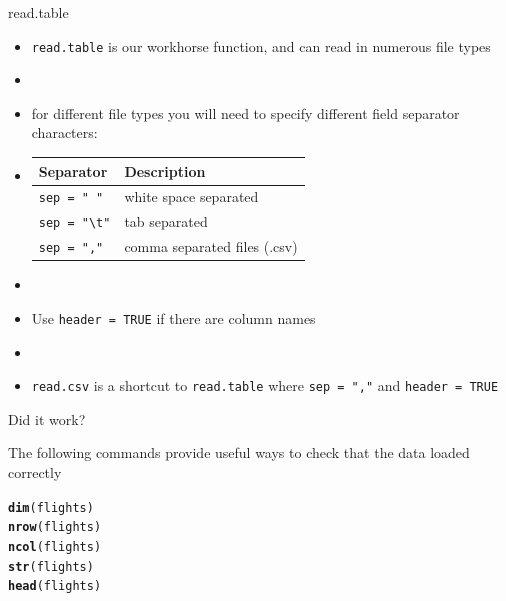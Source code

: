 \documentclass[10pt]{beamer}\usepackage[]{graphicx}\usepackage[]{color}
\makeatletter
\newcommand{\hlstd}[1]{\textcolor[rgb]{0.345,0.345,0.345}{#1}}%
\newcommand{\hlkwd}[1]{\textcolor[rgb]{0.737,0.353,0.396}{\textbf{#1}}}%
\newenvironment{kframe}{%
 \def\at@end@of@kframe{}%
 \ifinner\ifhmode%
  \def\at@end@of@kframe{\end{minipage}}%
  \begin{minipage}{\columnwidth}%
 \fi\fi%
 \def\FrameCommand##1{\hskip\@totalleftmargin \hskip-\fboxsep
 \colorbox{shadecolor}{##1}\hskip-\fboxsep
     \hskip-\linewidth \hskip-\@totalleftmargin \hskip\columnwidth}%
 \MakeFramed {\advance\hsize-\width
   \@totalleftmargin\z@ \linewidth\hsize
   \@setminipage}}%
 {\par\unskip\endMakeFramed%
 \at@end@of@kframe}
\newenvironment{knitrout}{}{} %
\makeatother
\begin{document}
\begin{frame}[fragile]{read.table}

\begin{itemize}
\item \texttt{read.table} is our workhorse function, and can read in numerous file types

\item[]

\item for different file types you will need to specify different field separator characters:\\

\item[]

\begin{tabular}{l  l} \hline
  Separator    & Description\\ \hline
  \texttt{sep = " "}  & white space separated\\
  \verb|sep = "\t"| & tab separated\\
  \texttt{sep = ","}  & comma separated files (.csv) \\ \hline
\end{tabular}

\item[]

\item Use \texttt{header = TRUE} if there are column names

\item[]

\item \texttt{read.csv} is a shortcut to \texttt{read.table} where \texttt{sep = ","} and \texttt{header = TRUE}
\end{itemize}

\end{frame}


\begin{frame}[fragile]{Did it work?}

The following commands provide useful ways to check that the data loaded correctly

\begin{knitrout}\small
{}\color{fgcolor}\begin{kframe}
\begin{alltt}
\hlkwd{dim}\hlstd{(flights)}
\hlkwd{nrow}\hlstd{(flights)}
\hlkwd{ncol}\hlstd{(flights)}
\hlkwd{str}\hlstd{(flights)}
\hlkwd{head}\hlstd{(flights)}
\end{alltt}
\end{kframe}
\end{knitrout}

\end{frame}
\end{document}
